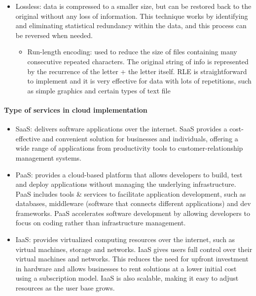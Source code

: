 \begin{itemize}
\begin{itemize}
\begin{enumerate}
\begin{enumerate}
\item Zigzag scan
\item RLE
\item Huffman coding
\end{enumerate}
\end{enumerate}
\end{itemize}
\item Lossless: data is compressed to a smaller size, but can be restored back to the original without any loss of information. This technique works by identifying and eliminating statistical redundancy within the data, and this process can be reversed when needed. 
	\begin{itemize}
		\item Run-length encoding: used to reduce the
size of files containing many consecutive repeated characters. The original string of info is represented by the recurrence of the letter + the letter itself. RLE is straightforward to implement and it is very effective for data with lots of repetitions, such as simple graphics and certain types of text file
	\end{itemize}
\end{itemize}
\paragraph{Type of services in cloud implementation}
\begin{itemize}
\item SaaS: delivers software applications over the internet. SaaS provides a cost-effective and convenient solution for businesses and individuals, offering a wide range of applications from productivity tools to customer-relationship management systems. 
\item PaaS: provides a cloud-based platform that allows developers to build, test and deploy applications without managing the underlying infrastructure. PaaS includes tools \& services to facilitate application development, such as databases, middleware (software that connects different applications) and dev frameworks. PaaS accelerates software development by allowing developers to focus on coding rather than infrastructure management.
\item IaaS: provides virtualized computing resources over the internet, such as virtual machines, storage and networks. IaaS gives users full control over their virtual machines and networks. This reduces the need for upfront investment in hardware and allows businesses to rent solutions at a lower initial cost using a subscription model. IaaS is also scalable, making it easy to adjust resources as the user base grows.
\end{itemize}
